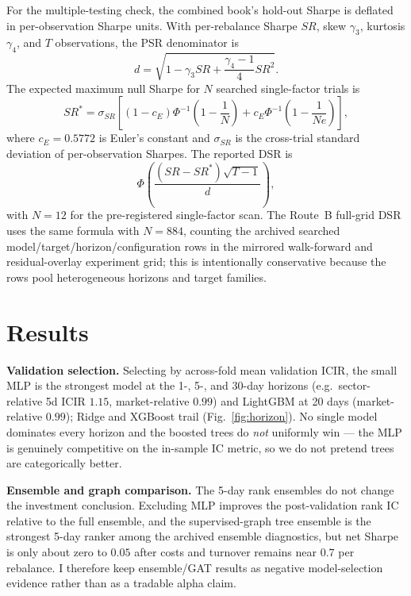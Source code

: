 \documentclass[9pt]{extarticle}
\begin{document}
For the multiple-testing check, the combined book's hold-out Sharpe is deflated
in per-observation Sharpe units. With per-rebalance Sharpe $SR$, skew
$\gamma_3$, kurtosis $\gamma_4$, and $T$ observations, the PSR denominator is
\[
  d=\sqrt{1-\gamma_3 SR+\frac{\gamma_4-1}{4}SR^2}.
\]
The expected maximum null Sharpe for $N$ searched single-factor trials is
\[
  SR^*=\sigma_{SR}
  \left[(1-c_E)\Phi^{-1}\!\left(1-\frac1N\right)
  +c_E\Phi^{-1}\!\left(1-\frac{1}{Ne}\right)\right],
\]
where $c_E=0.5772$ is Euler's constant and $\sigma_{SR}$ is the cross-trial
standard deviation of per-observation Sharpes. The reported DSR is
\[
  \Phi\!\left(\frac{(SR-SR^*)\sqrt{T-1}}{d}\right),
\]
with $N=12$ for the pre-registered single-factor scan. The Route~B full-grid
DSR uses the same formula with $N=884$, counting the archived searched
model/target/horizon/configuration rows in the mirrored walk-forward and
residual-overlay experiment grid; this is intentionally conservative because
the rows pool heterogeneous horizons and target families.

\section{Results}
\label{sec:results}

\textbf{Validation selection.} Selecting by across-fold mean validation ICIR,
the small MLP is the strongest model at the 1-, 5-, and 30-day horizons (e.g.\
sector-relative 5d ICIR $1.15$, market-relative $0.99$) and LightGBM at 20 days
(market-relative $0.99$); Ridge and XGBoost trail
(Fig.~\ref{fig:horizon}). No single model dominates every horizon and the boosted
trees do \emph{not} uniformly win --- the MLP is genuinely competitive on the
in-sample IC metric, so we do not pretend trees are categorically better.

\textbf{Ensemble and graph comparison.} The 5-day rank ensembles do not change
the investment conclusion. Excluding MLP improves the post-validation rank IC
relative to the full ensemble, and the supervised-graph tree ensemble is the
strongest 5-day ranker among the archived ensemble diagnostics, but net Sharpe is
only about zero to $0.05$ after costs and turnover remains near $0.7$ per
rebalance. I therefore keep ensemble/GAT results as negative model-selection
evidence rather than as a tradable alpha claim.
\end{document}
